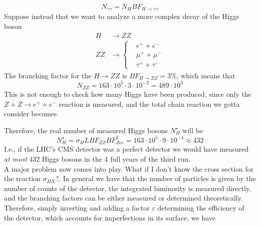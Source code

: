 \documentclass[../qm.tex]{subfiles}
\begin{document}
\begin{equation}
	N_{\gamma\gamma}=N_HBF_{H\to\gamma\gamma}
	\label{eq:htogammagamma}
\end{equation}
Suppose instead that we want to analyze a more complex decay of the Higgs boson
\begin{equation}
	\begin{aligned}
		H&\to ZZ\\
		ZZ&\to\left\{ \begin{aligned}
			&e^++e^-\\
			&\mu^++\mu^-\\
			&\tau^++\tau^-
	\end{aligned}\right.
	\end{aligned}
	\label{eq:HZZ}
\end{equation}
The branching factor for the $H\to ZZ$ is $BF_{H\to ZZ}=3\%$, which means that
\begin{equation*}
	N_{ZZ}=163\cdot10^5\cdot3\cdot10^{-2}=489\cdot10^{3}
\end{equation*}
This is not enough to check how many Higgs have been produced, since only the $Z+Z\to e^++e^-$ reaction is measured, and the total chain reaction we gotta consider becomes
\begin{figure}[H]
	\centering
\end{figure}
Therefore, the real number of measured Higgs bosons $N^\star_H$ will be
\begin{equation*}
	N_H^\star=\sigma_H LBF_{ZZ}BF_{Zee}^2=163\cdot10^5\cdot9\cdot10^{-4}\approx432
\end{equation*}
I.e., if the LHC's CMS detector was a perfect detector we would have measured \textit{at most} 432 Higgs bosons in the 4 full years of the third run.\\
A major problem now comes into play. What if I don't know the cross section for the reaction $\sigma_{HX}$?. In general we have that the number of particles is given by the number of counts of the detector, the integrated luminosity is measured directly, and the branching factors can be either measured or determined theoretically. Therefore, simply inverting and adding a factor $\varepsilon$ determining the efficiency of the detector, which accounts for imperfections in its surface, we have
\end{document}
